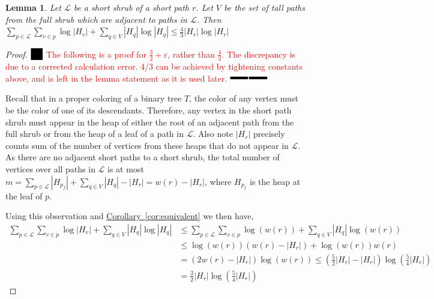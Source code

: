 \documentclass[11pt]{article}
\newtheorem{lemma}[theorem]{Lemma}
\theoremstyle{definition}
\newcommand{\eps}{\varepsilon}
\newcommand{\Cor}[1]{\hyperref[cor:#1]{Corollary~\ref*{cor:#1}}} %
\newcommand{\XSays}[2]{{
      {$\rule[-0.12cm]{0.2in}{0.5cm}$\fbox{\tt
            #1:} }
      \textcolor{red}{#2}
      \marginpar{\textcolor{blue}{#1}}
      {$\rule[0.1cm]{0.3in}{0.1cm}$\fbox{\tt
            end}$\rule[0.1cm]{0.3in}{0.1cm}$}
      }
   }
\newcommand{\Ben}[1]{{\XSays{Ben}{#1}}}
\newcommand{\pth}[2][\!]{#1\left({#2}\right)}
\begin{document}
\begin{lemma}
\label{lem:shortCost}
 Let $\mathcal{L}$ be a short shrub of a short path $r$.  Let $V$ be the set of tall paths from the full shrub which are adjacent to paths in $\mathcal{L}$.  
  Then $\sum_{p\in \mathcal{L}}\sum_{v\in p} \log |H_v| + \sum_{q\in V} |H_q|\log |H_q| \leq \frac{4}{3} |H_r|\log |H_r|$
\end{lemma}
\begin{proof}
\Ben{
The following is a proof for $\frac{3}{2}+\eps$, rather than $\frac{4}{3}$.  The discrepancy is due to a corrected calculation error.  
4/3 can be achieved by tightening constants above, and is left in the lemma statement as it is used later.
}

Recall that in a proper coloring of a binary tree $T$, the color of any vertex must be the color of one of its descendants.  
Therefore, any vertex in the short path shrub must appear in the heap of either the root of an adjacent 
path from the full shrub or from the heap of a leaf of a path in $\mathcal{L}$.  
Also note $|H_r|$ precisely counts sum of the number of vertices from these heaps that do not appear in $\mathcal{L}$.
As there are no adjacent short paths to a short shrub, the total number of vertices over all paths in $\mathcal{L}$ is at most 
$m = \sum_{p\in \mathcal{L}} |H_{p_f}| +\sum_{q\in V} |H_q| - |H_r| = w(r)-|H_r|$, where $H_{p_f}$ is the heap at the leaf of $p$. 

Using this observation and \Cor{equivalent} we then have, 
\begin{align*}
 \sum_{p\in \mathcal{L}}\sum_{v\in p} \log |H_v| + \sum_{q\in V} |H_q|\log |H_q|
 &\leq \sum_{p\in \mathcal{L}}\sum_{v\in p} \log(w(r)) + \sum_{q\in V} |H_q|\log(w(r))\\
 &\leq \log(w(r))\pth{ w(r)-|H_r| } + \log(w(r))w(r)\\ 
 &= (2w(r)-|H_r|)\log(w(r)) \leq \pth{\frac{5}{2}|H_r|-|H_r|}\log\pth{\frac{5}{4}|H_r|}\\
 &= \frac{3}{2}|H_r|\log\pth{\frac{5}{4}|H_r|}
\end{align*}
\end{proof}
\end{document}
